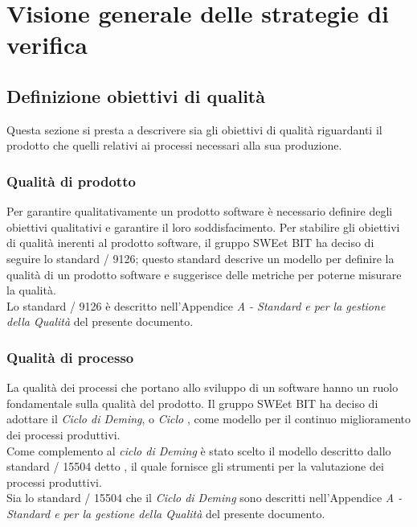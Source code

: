 \section{Visione generale delle strategie di verifica}
  \subsection{Definizione obiettivi di qualità}
  Questa sezione si presta a descrivere sia gli obiettivi di qualità riguardanti
  il prodotto che quelli relativi ai processi necessari alla sua produzione.
  \subsubsection{Qualità di prodotto}
    Per garantire qualitativamente un prodotto software è necessario definire
    degli obiettivi qualitativi e garantire il loro soddisfacimento. Per
    stabilire gli obiettivi di qualità inerenti al prodotto software, il gruppo
    SWEet BIT ha deciso di seguire lo standard / 9126; questo standard
    descrive un modello per definire la qualità di un prodotto software e
    suggerisce delle metriche per poterne misurare la qualità.\\
    Lo standard / 9126 è descritto nell'Appendice \emph{A - Standard e
     per la gestione della Qualità} del presente documento.

  \subsubsection{Qualità di processo}
    La qualità dei processi che portano allo sviluppo di un software hanno un
    ruolo fondamentale sulla qualità del prodotto. Il gruppo SWEet BIT ha deciso
    di adottare il \emph{Ciclo di Deming}, o \emph{Ciclo} ,
    come modello per il continuo miglioramento dei processi produttivi. \\
    Come complemento al \emph{ciclo di Deming} è stato scelto il modello descritto
    dallo standard / 15504 detto
    , il quale fornisce gli strumenti per la valutazione dei
    processi produttivi.\\
    Sia lo standard / 15504 che il
    \emph{Ciclo di Deming} sono descritti nell'Appendice \emph{A - Standard e
     per la gestione della Qualità} del presente documento.


